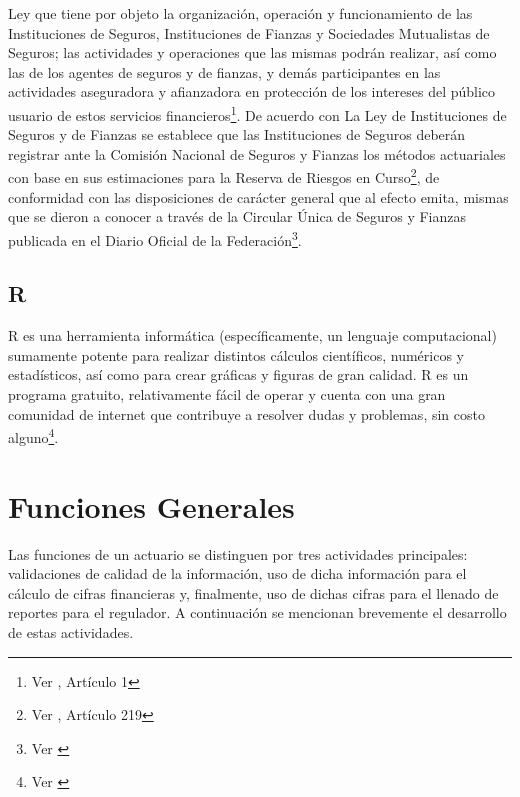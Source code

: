\documentclass[11pt,twoside,openright,spanish]{report}
\numberwithin{equation}{chapter}
\numberwithin{figure}{chapter}
\numberwithin{table}{chapter}
\begin{document}
	Ley que tiene por objeto la organización, operación y funcionamiento de las Instituciones de Seguros, Instituciones de Fianzas y Sociedades Mutualistas de Seguros; las actividades y operaciones que las mismas podrán realizar, así como las de los agentes de seguros y de fianzas, y demás participantes en las actividades aseguradora y afianzadora en protección de los intereses del público usuario de estos servicios financieros\footnote{Ver \citet{GLisf}, Artículo 1}. De acuerdo con La Ley de Instituciones de Seguros y de Fianzas se establece que las Instituciones de Seguros deberán registrar ante la Comisión Nacional de Seguros y Fianzas los métodos actuariales con base en sus estimaciones para la Reserva de Riesgos en Curso\footnote{Ver \citet{FAmis}, Artículo 219}, de conformidad con las disposiciones de carácter general que al efecto emita, mismas que se dieron a conocer a través de la Circular Única de Seguros y Fianzas publicada en el Diario Oficial de la Federación\footnote{Ver \citet{HCusf}}.
	
	
	\section{R}

	R es una herramienta informática (específicamente, un lenguaje computacional) sumamente potente para realizar distintos cálculos científicos, numéricos y estadísticos, así como para crear gráficas y figuras de gran calidad. R es un programa gratuito, relativamente fácil de operar y cuenta con una gran comunidad de internet que contribuye a resolver dudas y problemas, sin costo alguno\footnote{Ver \citet{KR}}. 
	
	
\chapter{Funciones Generales}\label{cap:Introducción}

Las funciones de un actuario se distinguen por tres actividades principales: validaciones de calidad de la información, uso de dicha información para el cálculo de cifras financieras y, finalmente, uso de dichas cifras para el llenado de reportes para el regulador. A continuación se mencionan brevemente el desarrollo de estas actividades.
\end{document}
